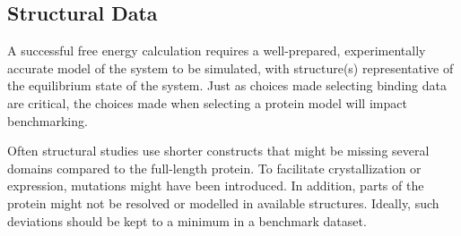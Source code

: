 \documentclass[9pt,bestpractices]{livecoms}
\begin{document}

\subsection{Structural Data}
\label{sec:struct_data}

A successful free energy calculation requires a well-prepared, experimentally accurate model of the system to be simulated, with structure(s) representative of the equilibrium state of the system. 
Just as choices made selecting binding data are critical, the choices made when selecting a protein model will impact benchmarking.

Often structural studies use shorter constructs that might be missing several domains compared to the full-length protein. To facilitate crystallization or expression, mutations might have been introduced. In addition, parts of the protein might not be resolved or modelled in available structures. Ideally, such deviations should be kept to a minimum in a benchmark dataset.
%
\end{document}
